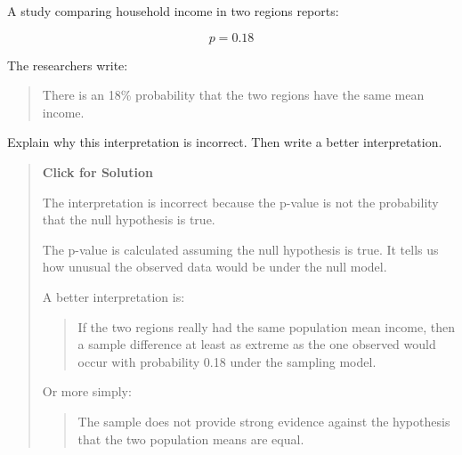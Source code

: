 \documentclass[
  letterpaper,
  DIV=11,
  numbers=noendperiod]{scrreprt}
\begin{document}
\begin{tcolorbox}[enhanced jigsaw, arc=.35mm, bottomrule=.15mm, bottomtitle=1mm, breakable, colback=white, colbacktitle=quarto-callout-note-color!10!white, colframe=quarto-callout-note-color-frame, coltitle=black, left=2mm, leftrule=.75mm, opacityback=0, opacitybacktitle=0.6, rightrule=.15mm, title=\textcolor{quarto-callout-note-color}{\faInfo}\hspace{0.5em}{Question 5}, titlerule=0mm, toprule=.15mm, toptitle=1mm]

A study comparing household income in two regions reports:

\[
p = 0.18
\]

The researchers write:

\begin{quote}
There is an 18\% probability that the two regions have the same mean
income.
\end{quote}

Explain why this interpretation is incorrect. Then write a better
interpretation.

\begin{quote}
\textbf{Click for Solution}

The interpretation is incorrect because the p-value is not the
probability that the null hypothesis is true.

The p-value is calculated assuming the null hypothesis is true. It tells
us how unusual the observed data would be under the null model.

A better interpretation is:

\begin{quote}
If the two regions really had the same population mean income, then a
sample difference at least as extreme as the one observed would occur
with probability 0.18 under the sampling model.
\end{quote}

Or more simply:

\begin{quote}
The sample does not provide strong evidence against the hypothesis that
the two population means are equal.
\end{quote}
\end{quote}

\end{tcolorbox}
\end{document}
